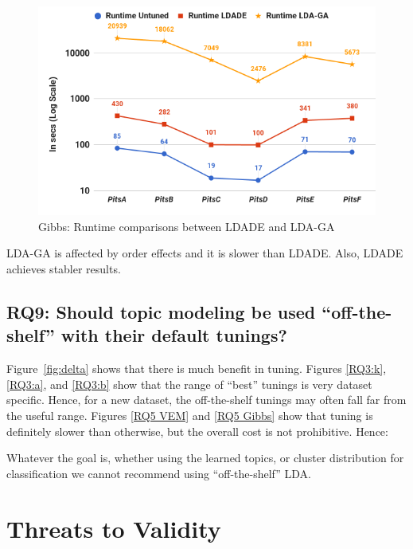 \documentclass[twocolumn,5p,sort&compress]{elsarticle}
\theoremstyle{break}
\begin{document}
\begin{figure}[!t]
  \includegraphics[width=\linewidth]{./fig/runtime_ga.png}
  \caption{Gibbs: Runtime comparisons between LDADE and LDA-GA}
  \label{fig:run_ldaga}
\end{figure}

  \begin{lesson}
    LDA-GA is affected by order effects and it is slower than LDADE. Also, LDADE achieves stabler results.
  \end{lesson}

\subsection{\textbf{RQ9: Should topic modeling be used ``off-the-shelf'' with their default tunings?}}

  Figure~\ref{fig:delta} shows that there is much benefit in tuning.
  Figures \ref{RQ3:k}, \ref{RQ3:a}, and \ref{RQ3:b} show that
  the range of ``best'' tunings is very dataset specific. Hence, for a new dataset,
  the off-the-shelf tunings
  may often fall far from the useful range.
  Figures \ref{RQ5 VEM} and \ref{RQ5 Gibbs} show that tuning is definitely
  slower than otherwise, but the overall cost is not prohibitive.
  Hence:
  \begin{lesson}
    Whatever the goal is, whether using the learned topics, or cluster distribution for classification
    we cannot recommend using ``off-the-shelf'' LDA.
  \end{lesson}


\section{Threats to Validity}
\label{sect:validity}
\end{document}
